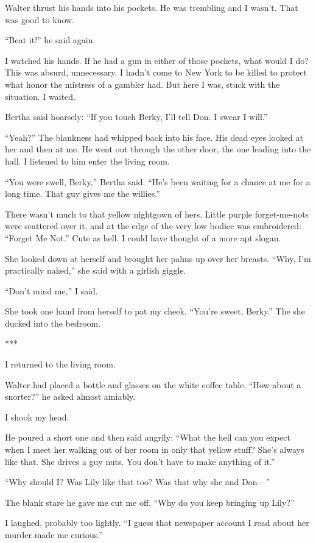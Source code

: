 \documentclass{novel}
\begin{document}
{Walter thrust his hands into his pockets. He was trembling and I wasn’t. That was good to know.

“Beat it!” he said again.

I watched his hands. If he had a gun in either of those pockets, what would I do? This was absurd, unnecessary. I hadn’t come to New York to be killed to protect what honor the mistress of a gambler had. But here I was, stuck with the situation. I waited.

Bertha said hoarsely: “If you touch Berky, I’ll tell Don. I swear I will.”

“Yeah?” The blankness had whipped back into his face. His dead eyes looked at her and then at me. He went out through the other door, the one leading into the hall. I listened to him enter the living room.

“You were swell, Berky,” Bertha said. “He’s been waiting for a chance at me for a long time. That guy gives me the willies.”

There wasn’t much to that yellow nightgown of hers. Little purple forget-me-nots were scattered over it, and at the edge of the very low bodice was embroidered: “Forget Me Not.” Cute as hell. I could have thought of a more apt slogan.

She looked down at herself and brought her palms up over her breasts. “Why, I’m practically naked,” she said with a girlish giggle.

“Don’t mind me,” I said.

She took one hand from herself to pat my cheek. “You’re sweet, Berky.” The she ducked into the bedroom.

***

I returned to the living room.

Walter had placed a bottle and glasses on the white coffee table. “How about a snorter?” he asked almost amiably.

I shook my head.

He poured a short one and then said angrily: “What the hell can you expect when I meet her walking out of her room in only that yellow stuff? She’s always like that. She drives a guy nuts. You don’t have to make anything of it.”

“Why should I? Was Lily like that too? Was that why she and Don—”

The blank stare he gave me cut me off. “Why do you keep bringing up Lily?”

I laughed, probably too lightly. “I guess that newspaper account I read about her murder made me curious.”

}
\end{document}
